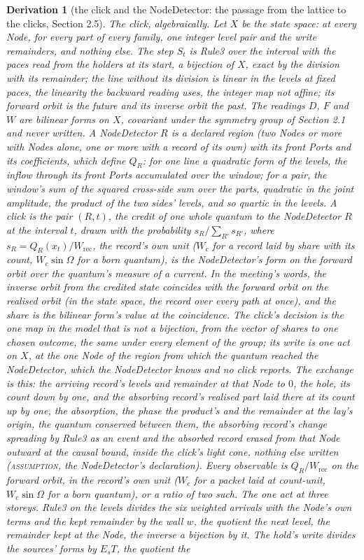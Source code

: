 \documentclass[pdflatex,sn-mathphys-num]{sn-jnl}
\newcommand{\claimmark}[1]{\textup{\textsc{#1}}}
\newcommand{\Wc}{W_c}
\theoremstyle{thmstyleone}
\newtheorem{derivation}{Derivation}
\begin{document}
\begin{derivation}[the click and the NodeDetector: the passage from the lattice to the clicks, Section 2.5]
\emph{The click, algebraically.} Let $X$ be the state space: at every Node, for every part of every family, one integer level pair and the write remainders, and nothing else. The step $S_t$ is Rule3 over the interval with the paces read from the holders at its start, a bijection of $X$, exact by the division with its remainder; the line without its division is linear in the levels at fixed paces, the linearity the backward reading uses, the integer map not affine; its forward orbit is the future and its inverse orbit the past. The readings $D$, $F$ and $W$ are bilinear forms on $X$, covariant under the symmetry group of Section 2.1 and never written. A NodeDetector $R$ is a declared region (two Nodes or more with Nodes alone, one or more with a record of its own) with its front Ports and its coefficients, which define $Q_R$: for one line a quadratic form of the levels, the inflow through its front Ports accumulated over the window; for a pair, the window's sum of the squared cross-side sum over the parts, quadratic in the joint amplitude, the product of the two sides' levels, and so quartic in the levels. A click is the pair $(R, t)$, the credit of one whole quantum to the NodeDetector $R$ at the interval $t$, drawn with the probability $s_R / \sum_{R'} s_{R'}$, where $s_R = Q_R(x_t) / W_{\mathrm{rec}}$, the record's own unit ($\Wc$ for a record laid by share with its count, $\Wc\sin\Omega$ for a born quantum), is the NodeDetector's form on the forward orbit over the quantum's measure of a current. In the meeting's words, the inverse orbit from the credited state coincides with the forward orbit on the realised orbit (in the state space, the record over every path at once), and the share is the bilinear form's value at the coincidence. The click's decision is the one map in the model that is not a bijection, from the vector of shares to one chosen outcome, the same under every element of the group; its write is one act on $X$, at the one Node of the region from which the quantum reached the NodeDetector, which the NodeDetector knows and no click reports. The exchange is this: the arriving record's levels and remainder at that Node to $0$, the hole, its count down by one, and the absorbing record's realised part laid there at its count up by one, the absorption, the phase the product's and the remainder at the lay's origin, the quantum conserved between them, the absorbing record's change spreading by Rule3 as an event and the absorbed record erased from that Node outward at the causal bound, inside the click's light cone, nothing else written (\claimmark{assumption}, the NodeDetector's declaration). Every observable is $Q_R / W_{\mathrm{rec}}$ on the forward orbit, in the record's own unit ($\Wc$ for a packet laid at count-unit, $\Wc\sin\Omega$ for a born quantum), or a ratio of two such. \emph{The one act at three storeys.} Rule3 on the levels divides the six weighted arrivals with the Node's own terms and the kept remainder by the wall $w$, the quotient the next level, the remainder kept at the Node, the inverse a bijection by it. The hold's write divides the sources' forms by $E_s T$, the quotient the 
\end{derivation}
\end{document}
